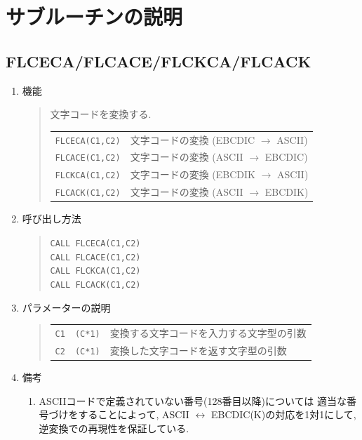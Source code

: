 \section{サブルーチンの説明}

\subsection{FLCECA/FLCACE/FLCKCA/FLCACK}
\begin{enumerate}
  \item 機能
  \begin{quote}
    文字コードを変換する.\\
    \begin{tabular}{lp{10cm}}
     {\tt FLCECA(C1,C2)}  & 文字コードの変換 (EBCDIC $\to$ ASCII) \\
     {\tt FLCACE(C1,C2)}  & 文字コードの変換 (ASCII $\to$ EBCDIC) \\
     {\tt FLCKCA(C1,C2)}  & 文字コードの変換 (EBCDIK $\to$ ASCII) \\
     {\tt FLCACK(C1,C2)}  & 文字コードの変換 (ASCII $\to$ EBCDIK)
  \end{tabular}
  \end{quote}
  \item 呼び出し方法
  \begin{quote}
    {\tt CALL FLCECA(C1,C2)}\\
    {\tt CALL FLCACE(C1,C2)}\\
    {\tt CALL FLCKCA(C1,C2)}\\
    {\tt CALL FLCACK(C1,C2)}
  \end{quote}
  \item パラメーターの説明
  \begin{quote}
    \begin{tabular}{llp{10cm}}
      {\tt C1} & {\tt (C*1)} & 変換する文字コードを入力する文字型の引数\\
      {\tt C2} & {\tt (C*1)} & 変換した文字コードを返す文字型の引数
    \end{tabular}
  \end{quote}
  \item 備考
  \begin{enumerate}
    \item ASCIIコードで定義されていない番号(128番目以降)については
          適当な番号づけをすることによって, ASCII $\leftrightarrow$
          EBCDIC(K)の対応を1対1にして, 逆変換での再現性を保証している.
  \end{enumerate}
\end{enumerate}


